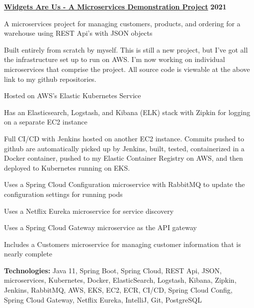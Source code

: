 %
    \headerrow
        {\textbf{\href{https://github.com/johatfie/widgets-are-us}{Widgets Are Us - A Microservices Demonstration Project}}}
        {\textbf{2021}}
    \begin{itemize*}
        \item A microservices project for managing customers, products, and ordering for a warehouse using REST Api's with JSON objects
        \item Built entirely from scratch by myself.  This is still a new project, but I've got all the infrastructure set up to run
            on AWS.  I'm now working on individual microservices that comprise the project.  All source code is viewable
            at the above link to my github repositories.
        \item Hosted on AWS's Elastic Kubernetes Service
        \item Has an Elasticsearch, Logstash, and Kibana (ELK) stack with Zipkin for logging on a separate EC2 instance
        \item Full CI/CD with Jenkins hosted on another EC2 instance.  Commits pushed to github are automatically picked up by
            Jenkins, built, tested, containerized in a Docker container, pushed to my Elastic Container Registry on AWS, and then
            deployed to Kubernetes running on EKS.
        \item Uses a Spring Cloud Configuration microservice with RabbitMQ to update the configuration settings for running pods
        \item Uses a Netflix Eureka microservice for service discovery
        \item Uses a Spring Cloud Gateway microservice as the API gateway
        \item Includes a Customers microservice for managing customer information that is nearly complete
    \end{itemize*}

    \hspace{1.0em}
        {\textbf{Technologies:} Java 11, Spring Boot, Spring Cloud, REST Api, JSON, microservices, Kubernetes, Docker, ElasticSearch,
        Logstash, Kibana, Zipkin, Jenkins, RabbitMQ, AWS, EKS, EC2, ECR, CI/CD, Spring Cloud Config, Spring Cloud Gateway,
        Netflix Eureka, IntelliJ, Git, PostgreSQL}

